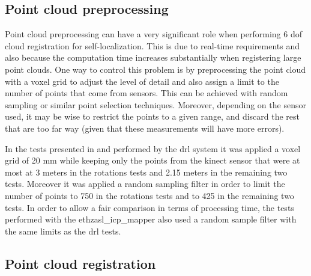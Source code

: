 \subsection{Point cloud preprocessing}

Point cloud preprocessing can have a very significant role when performing 6 \gls{dof} cloud registration for self-localization. This is due to real-time requirements and also because the computation time increases substantially when registering large point clouds. One way to control this problem is by preprocessing the point cloud with a voxel grid to adjust the level of detail and also assign a limit to the number of points that come from sensors. This can be achieved with random sampling or similar point selection techniques. Moreover, depending on the sensor used, it may be wise to restrict the points to a given range, and discard the rest that are too far way (given that these measurements will have more errors).

In the tests presented in  and performed by the \gls{drl} system it was applied a voxel grid of 20 mm while keeping only the points from the kinect sensor that were at most at 3 meters in the rotations tests and 2.15 meters in the remaining two tests. Moreover it was applied a random sampling filter in order to limit the number of points to 750 in the rotations tests and to 425 in the remaining two tests. In order to allow a fair comparison in terms of processing time, the tests performed with the ethzasl\_icp\_mapper also used a random sample filter with the same limits as the \gls{drl} tests.




\subsection{Point cloud registration}

